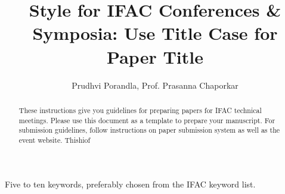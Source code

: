 \documentclass{absconf}
\begin{document}
\begin{frontmatter}

\title{Style for IFAC Conferences \& Symposia: Use Title Case for
Paper Title}

\author{Prudhvi Porandla, Prof. Prasanna Chaporkar} 
\address{ Electrical Engineering, IIT Bombay   }
\begin{abstract}                %
	These instructions give you guidelines for preparing papers for IFAC
technical meetings. Please use this document as a template to prepare
your manuscript. For submission guidelines, follow instructions on
paper submission system as well as the event website.
Thishiof
\end{abstract}

\begin{keyword}
Five to ten keywords, preferably chosen from the IFAC keyword list.
\end{keyword}

\end{frontmatter}
\end{document}

